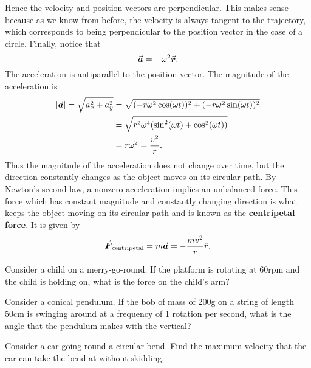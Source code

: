 \documentclass[../newtonian_mechanics.tex]{subfiles}
\begin{document}
        Hence the velocity and position vectors are perpendicular.
        This makes sense because as we know from before, the velocity is always tangent to the trajectory, which corresponds to being perpendicular to the position vector in the case of a circle.
        Finally, notice that
        \begin{equation}
            \vec{\boldsymbol a}=-\omega^2\vec{\boldsymbol r}.
        \end{equation}
        The acceleration is antiparallel to the position vector.
        The magnitude of the acceleration is
        \begin{align}
            \lvert\vec{\boldsymbol a}\rvert=\sqrt{a_x^2+a_y^2}&=\sqrt{(-r\omega^2\cos(\omega t))^2+(-r\omega^2\sin(\omega t))^2}\\
            &=\sqrt{r^2\omega^4(\sin^2(\omega t)+\cos^2(\omega t))}\\
            &=r\omega^2=\frac{v^2}{r}.
        \end{align}
        Thus the magnitude of the acceleration does not change over time, but the direction constantly changes as the object moves on its circular path.
        By Newton's second law, a nonzero acceleration implies an unbalanced force.
        This force which has constant magnitude and constantly changing direction is what keeps the object moving on its circular path and is known as the \textbf{centripetal force}.
        It is given by
        \begin{equation}
            \vec{\boldsymbol F}_\text{centripetal}=m\vec{\boldsymbol a}=-\frac{mv^2}{r}\hat{r}.
        \end{equation}
        \begin{example}
            Consider a child on a merry-go-round.
            If the platform is rotating at 60rpm and the child is holding on, what is the force on the child's arm?
        \end{example}
        \begin{example}
            Consider a conical pendulum. 
            If the bob of mass of 200g on a string of length 50cm is swinging around at a frequency of 1 rotation per second, what is the angle that the pendulum makes with the vertical?
        \end{example}
        \begin{example}
            Consider a car going round a circular bend.
            Find the maximum velocity that the car can take the bend at without skidding.
        \end{example}
\end{document}
